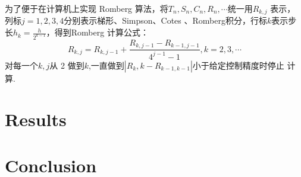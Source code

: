 \documentclass{ctexart}
\begin{document}
为了便于在计算机上实现 Romberg 算法，将$T_n,S_n,C_n,R_n,\cdots$统一用$R_{k,j}$ 表示，
列标$j=1,2,3,4$分别表示梯形、Simpson、Cotes 、Romberg积分，行标$k$表示步长$h_k=\frac h{2^{k-1}}$，得到Romberg 计算公式：
$$R_{k,j}=R_{k,j-1}+\frac{R_{k,j-1}-R_{k-1,j-1}}{4^{j-1}-1},k=2,3,\cdots $$
对每一个$k,j$从 2 做到$k$,一直做到$|R_k,k-R_{k-1,k-1}|$小于给定控制精度时停止
计算.
	\section{Results}
		
			
		\section{Conclusion}
    
\end{document}
